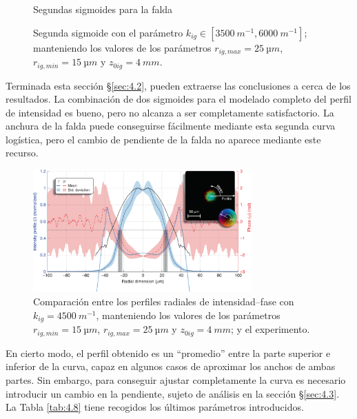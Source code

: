 \begin{figure}[htbp]
\begin{subcaptionblock}{.4\textwidth}
    \caption{Segundas sigmoides para la falda}\label{fig:ch4_sigm2_rg}
  \end{subcaptionblock}
  \caption{Segunda sigmoide con el parámetro $k_{ig}\in[\qty{3500}{m^{-1}},\qty{6000}{m^{-1}}]$; manteniendo los valores de los parámetros $r_{ig,max}=\qty{25}{µm}$, $r_{ig,min}=\qty{15}{µm}$ y $z_{0ig}=\qty{4}{mm}$.}
   \label{fig:4.26}
\end{figure}

Terminada esta sección \S\ref{sec:4.2}, pueden extraerse las conclusiones a cerca de los resultados. La combinación de dos sigmoides para el modelado completo del perfil de intensidad es bueno, pero no alcanza a ser completamente satisfactorio. La anchura de la falda puede conseguirse fácilmente mediante esta segunda curva logística, pero el cambio de pendiente de la falda no aparece mediante este recurso. 

\begin{figure}[htbp]
  \centering
  \includegraphics[width=0.75\textwidth]{Figuras/ch4_cmp61.png}
  \caption{Comparación entre los perfiles radiales de intensidad--fase con $k_{ig}=\qty{4500}{m^{-1}}$, manteniendo los valores de los parámetros $r_{ig,min}=\qty{15}{µm}$, $r_{ig,max}=\qty{25}{µm}$ y $z_{0ig}=\qty{4}{mm}$; y el experimento.}
  \label{fig:4.27}
\end{figure}

En cierto modo, el perfil obtenido es un \enquote{promedio} entre la parte superior e inferior de la curva, capaz en algunos casos de aproximar los anchos de ambas partes. Sin embargo, para conseguir ajustar completamente la curva es necesario introducir un cambio en la pendiente, sujeto de análisis en la sección \S\ref{sec:4.3}. La Tabla \ref{tab:4.8} tiene recogidos los últimos parámetros introducidos. 


